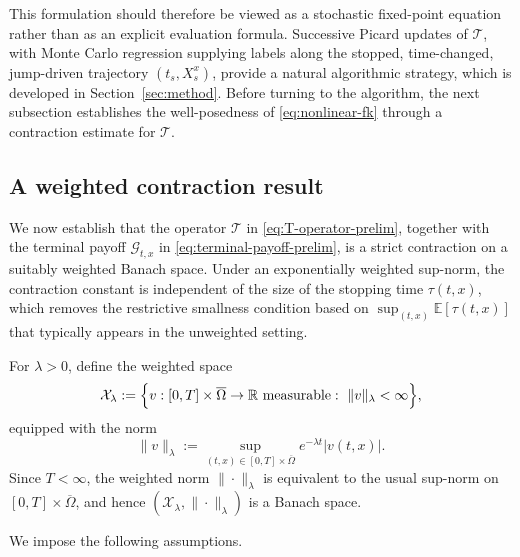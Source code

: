 \documentclass[a4paper,fleqn]{cas-sc}
\begin{document}
This formulation should therefore be viewed as a stochastic fixed-point equation
rather than as an explicit evaluation formula. Successive Picard updates of
$\mathcal{T}$, with Monte Carlo regression supplying labels along the stopped,
time-changed, jump-driven trajectory $(t_s,X_s^x)$, provide a natural algorithmic
strategy, which is developed in Section~\ref{sec:method}. Before turning to the
algorithm, the next subsection establishes the well-posedness of
\eqref{eq:nonlinear-fk} through a contraction estimate for $\mathcal{T}$.


\subsection{A weighted contraction result}
\label{subsec:weighted-contraction}

We now establish that the operator $\mathcal{T}$ in \eqref{eq:T-operator-prelim},
together with the terminal payoff $\mathcal{G}_{t,x}$ in
\eqref{eq:terminal-payoff-prelim}, is a strict contraction on a suitably weighted
Banach space. Under an exponentially weighted sup-norm, the contraction constant
is independent of the size of the stopping time $\tau(t,x)$, which removes the
restrictive smallness condition based on
$\sup_{(t,x)}\mathbb{E}[\tau(t,x)]$ that typically appears in the unweighted
setting.

For $\lambda>0$, define the weighted space
\[
\mathcal{X}_\lambda
:=
\Bigl\{
v:[0,T]\times\overline{\Omega}\to\mathbb{R}\ \text{measurable}:\ 
\|v\|_\lambda<\infty
\Bigr\},
\]
equipped with the norm
\begin{equation}\label{eq:weighted-norm-final}
\|v\|_\lambda
:=
\sup_{(t,x)\in[0,T]\times\overline{\Omega}}
e^{-\lambda t}|v(t,x)|.
\end{equation}
Since $T<\infty$, the weighted norm $\|\cdot\|_\lambda$ is equivalent to the usual sup-norm on $[0,T]\times\overline{\Omega}$, and hence $(\mathcal{X}_\lambda,\|\cdot\|_\lambda)$ is a Banach space.

We impose the following assumptions.
\end{document}

